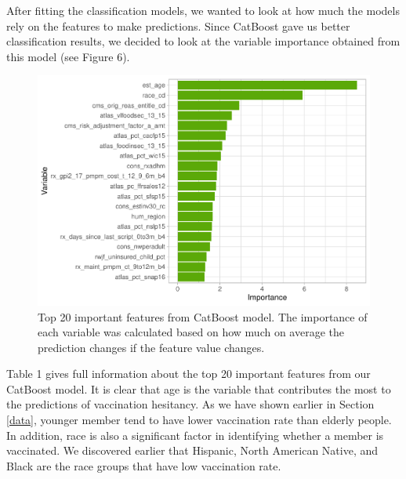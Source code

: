 \documentclass[
  12pt,
]{article}
\begin{document}
After fitting the classification models, we wanted to look at how much
the models rely on the features to make predictions. Since CatBoost gave
us better classification results, we decided to look at the variable
importance obtained from this model (see Figure 6).

\begin{figure}[H]

{\centering \includegraphics{report_files/figure-latex/unnamed-chunk-8-1} 

}

\caption{Top 20 important features from CatBoost model. The importance of each variable was calculated based on how much on average the prediction changes if the feature value changes.}\label{fig:unnamed-chunk-8}
\end{figure}

Table 1 gives full information about the top 20 important features from
our CatBoost model. It is clear that age is the variable that
contributes the most to the predictions of vaccination hesitancy. As we
have shown earlier in Section \ref{data}, younger member tend to have
lower vaccination rate than elderly people. In addition, race is also a
significant factor in identifying whether a member is vaccinated. We
discovered earlier that Hispanic, North American Native, and Black are
the race groups that have low vaccination rate.

\singlespacing

\small
\end{document}
